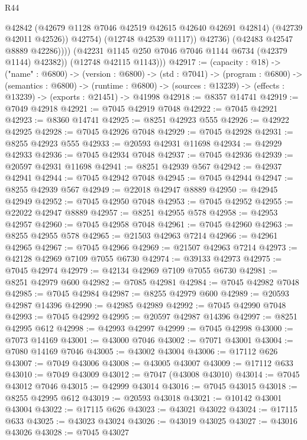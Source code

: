 \begin{lexlean}{R44}
\begin{coremodule}
{                        @42842
                        (@42679 @1128 @7046 @42519 @42615 @42640 @42691 @42814)
                        (@42739 @42011 @42526))
                      @42754)
                    (@12748 @42539 @1117))
                  @42736)
                (@42483 @42547 @8889 @42286))))
          (@42231 @1145 @250 @7046 @7046 @1144 @6734 (@42379 @1144) @42382))
        (@12748 @42115 @1143)))
@42917 := (capacity : @18) ->
  ("name" : @6800) ->
  (version : @6800) ->
  (std : @7041) ->
  (program : @6800) ->
  (semantics : @6800) ->
  (runtime : @6800) -> (sources : @13239) -> (effects : @13239) -> (exports : @21451) -> @41998
@42918 := @8357 @14741
@42919 := @7049 @42918
@42921 := @7045 @42919 @7048
@42922 := @7045 @42921
@42923 := @8360 @14741
@42925 := @8251 @42923 @555
@42926 := @42922 @42925
@42928 := @7045 @42926 @7048
@42929 := @7045 @42928
@42931 := @8255 @42923 @555
@42933 := @20593 @42931 @11698
@42934 := @42929 @42933
@42936 := @7045 @42934 @7048
@42937 := @7045 @42936
@42939 := @20597 @42931 @11698
@42941 := @8251 @42939 @567
@42942 := @42937 @42941
@42944 := @7045 @42942 @7048
@42945 := @7045 @42944
@42947 := @8255 @42939 @567
@42949 := @22018 @42947 @8889
@42950 := @42945 @42949
@42952 := @7045 @42950 @7048
@42953 := @7045 @42952
@42955 := @22022 @42947 @8889
@42957 := @8251 @42955 @578
@42958 := @42953 @42957
@42960 := @7045 @42958 @7048
@42961 := @7045 @42960
@42963 := @8255 @42955 @578
@42965 := @21503 @42963 @7214
@42966 := @42961 @42965
@42967 := @7045 @42966
@42969 := @21507 @42963 @7214
@42973 := @42128 @42969 @7109 @7055 @6730
@42974 := @39133 @42973
@42975 := @7045 @42974
@42979 := @42134 @42969 @7109 @7055 @6730
@42981 := @8251 @42979 @600
@42982 := @7085 @42981
@42984 := @7045 @42982 @7048
@42985 := @7045 @42984
@42987 := @8255 @42979 @600
@42989 := @20593 @42987 @14396
@42990 := @42985 @42989
@42992 := @7045 @42990 @7048
@42993 := @7045 @42992
@42995 := @20597 @42987 @14396
@42997 := @8251 @42995 @612
@42998 := @42993 @42997
@42999 := @7045 @42998
@43000 := @7073 @14169
@43001 := @43000 @7046
@43002 := @7071 @43001
@43004 := @7080 @14169 @7046
@43005 := @43002 @43004
@43006 := @17112 @626
@43007 := @7049 @43006
@43008 := @43005 @43007
@43009 := @17112 @633
@43010 := @7049 @43009
@43012 := @7047 (@43008 @43010)
@43014 := @7045 @43012 @7046
@43015 := @42999 @43014
@43016 := @7045 @43015
@43018 := @8255 @42995 @612
@43019 := @20593 @43018
@43021 := @10142 @43001 @43004
@43022 := @17115 @626
@43023 := @43021 @43022
@43024 := @17115 @633
@43025 := @43023 @43024
@43026 := @43019 @43025
@43027 := @43016 @43026
@43028 := @7045 @43027
}
\end{coremodule}
\end{lexlean}
